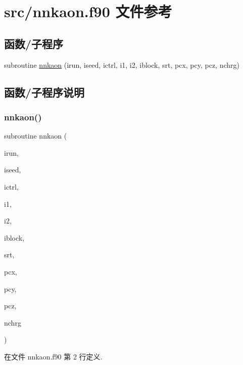 \hypertarget{nnkaon_8f90}{}\section{src/nnkaon.f90 文件参考}
\label{nnkaon_8f90}
\subsection*{函数/子程序}
\begin{DoxyCompactItemize}
\item 
subroutine \mbox{\hyperlink{nnkaon_8f90_a61308853c27c4189497a76a98542bba0}{nnkaon}} (irun, iseed, ictrl, i1, i2, iblock, srt, pcx, pcy, pcz, nchrg)
\end{DoxyCompactItemize}


\subsection{函数/子程序说明}
\mbox{\label{nnkaon_8f90_a61308853c27c4189497a76a98542bba0}} 
\subsubsection{\texorpdfstring{nnkaon()}{nnkaon()}}
{\footnotesize\ttfamily subroutine nnkaon (\begin{DoxyParamCaption}\item[{}]{irun,  }\item[{}]{iseed,  }\item[{}]{ictrl,  }\item[{}]{i1,  }\item[{}]{i2,  }\item[{}]{iblock,  }\item[{}]{srt,  }\item[{}]{pcx,  }\item[{}]{pcy,  }\item[{}]{pcz,  }\item[{}]{nchrg }\end{DoxyParamCaption})}



在文件 nnkaon.\+f90 第 2 行定义.

